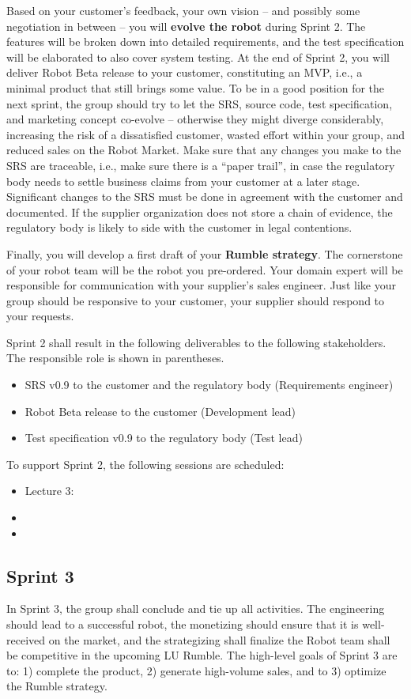 \documentclass{scrreprt}
\begin{document}
Based on your customer's feedback, your own vision -- and possibly some negotiation in between -- you will \textbf{evolve the robot} during Sprint 2. The features will be broken down into detailed requirements, and the test specification will be elaborated to also cover system testing. At the end of Sprint 2, you will deliver Robot Beta release to your customer, constituting an MVP, i.e., a minimal product that still brings some value. To be in a good position for the next sprint, the group should try to let the SRS, source code, test specification, and marketing concept co-evolve -- otherwise they might diverge considerably, increasing the risk of a dissatisfied customer, wasted effort within your group, and reduced sales on the Robot Market. Make sure that any changes you make to the SRS are traceable, i.e., make sure there is a ``paper trail'', in case the regulatory body needs to settle business claims from your customer at a later stage. Significant changes to the SRS must be done in agreement with the customer and documented. If the supplier organization does not store a chain of evidence, the regulatory body is likely to side with the customer in legal contentions.

Finally, you will develop a first draft of your \textbf{Rumble strategy}. The cornerstone of your robot team will be the robot you pre-ordered. Your domain expert will be responsible for communication with your supplier's sales engineer. Just like your group should be responsive to your customer, your supplier should respond to your requests.

Sprint 2 shall result in the following deliverables to the following stakeholders. The responsible role is shown in parentheses.
\begin{itemize}
\item SRS v0.9 to the customer and the regulatory body (Requirements engineer)
\item Robot Beta release to the customer (Development lead)
\item Test specification v0.9 to the regulatory body (Test lead)
\end{itemize}

To support Sprint 2, the following sessions are scheduled:
\begin{itemize}
\item Lecture 3:
\item 
\item
\end{itemize}

\subsection{Sprint 3}
In Sprint 3, the group shall conclude and tie up all activities. The engineering should lead to a successful robot, the monetizing should ensure that it is well-received on the market, and the strategizing shall finalize the Robot team shall be competitive in the upcoming LU Rumble. The high-level goals of Sprint 3 are to: 1) complete the product, 2) generate high-volume sales, and to 3) optimize the Rumble strategy.
\end{document}
